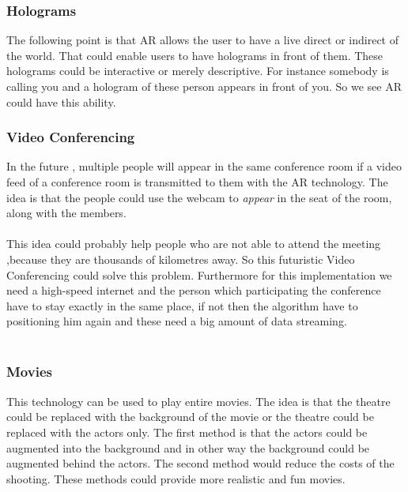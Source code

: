  \subsubsection{Holograms}
 The following point is that AR allows  the user to have a live direct or indirect of the world. That could enable users to have holograms in front of them. These holograms could be interactive or merely descriptive.  For instance somebody is calling you and a hologram of these person appears in front of you. So we see AR could have this ability.\cite{AugmentedBook}
 \subsubsection{Video Conferencing}
 In the future , multiple people will appear in the same conference room if a video feed of a conference room is  transmitted to them with the AR technology.  The idea is that the people could use  the webcam to \textit{appear} in the seat of the room, along with the members.\cite{AugmentedBook}
 \\
 \\
 This idea could probably help people who are not able to attend the meeting ,because they are thousands of kilometres away. So this futuristic Video Conferencing could solve this problem. Furthermore for this implementation we need a high-speed internet and the person which participating the conference have to stay  exactly in the same place, if not then the algorithm have to positioning him again and these need a big amount of data streaming.\cite{AugmentedBook}
 \\
 \\
 \subsubsection{Movies}
 This technology can be used  to play entire movies.  The idea is that the theatre could be replaced with the background of the movie  or the theatre could be replaced with the actors only.  The first method is that the actors could be augmented into the background and in  other way the background could be augmented behind the actors. The second method would reduce the costs of the shooting. These methods could provide more realistic and fun movies.\cite{AugmentedBook}
 \\
 \\

